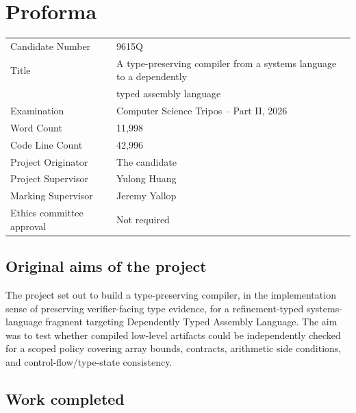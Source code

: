 \section*{Proforma}
\begin{tabular}{ll}
  Candidate Number          & 9615Q                                                                       \\
  Title                     & A type-preserving compiler from a systems language to a dependently         \\
                            & typed assembly language                                                     \\
  Examination               & Computer Science Tripos -- Part II, 2026                                    \\
  Word Count                & 11,998\footnotemark
  \\
  Code Line Count           & 42,996\footnotemark
  \\
  Project Originator        & The candidate                                                               \\
  Project Supervisor        & Yulong Huang                                                                \\
  Marking Supervisor        & Jeremy Yallop                                                               \\
  Ethics committee approval & Not required
\end{tabular}
\addtocounter{footnote}{-1}

\subsection*{Original aims of the project}

The project set out to build a type-preserving compiler, in the implementation sense of preserving verifier-facing type evidence, for a refinement-typed systems-language fragment targeting Dependently Typed Assembly Language. The aim was to test whether compiled low-level artifacts could be independently checked for a scoped policy covering array bounds, contracts, arithmetic side conditions, and control-flow/type-state consistency.

\subsection*{Work completed}

